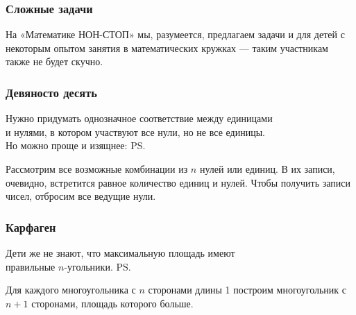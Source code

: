 \begin{frame} \frametitle{Сложные задачи}
	На «Математике НОН-СТОП» мы, разумеется, предлагаем задачи и для детей с некоторым опытом занятия в математических кружках — таким участникам также не будет скучно.
\end{frame}

\begin{frame} \frametitle{Девяносто десять}
 \vspace{4mm}

Нужно придумать однозначное соответствие между единицами \\
и нулями, в котором участвуют все нули, но не все единицы. \\
Но можно проще и изящнее: \ps

	Рассмотрим все возможные
	комбинации из $n$ нулей или единиц. В их записи, очевидно,
	встретится равное количество единиц и нулей. Чтобы получить
	записи чисел, отбросим все ведущие нули.
\end{frame}

\begin{frame} \frametitle{Карфаген}
 \vspace{4mm}

Дети же не знают, что максимальную площадь имеют \\
правильные $n$-угольники. \ps

Для каждого многоугольника с $n$ сторонами длины 1 построим многоугольник с $n+1$ сторонами, площадь которого больше.
\end{frame}

